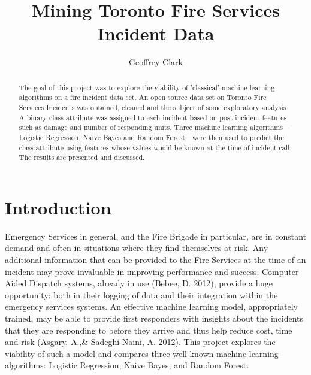 \documentclass[12pt,letterpaper, oneside]
{article}
\title{Mining Toronto Fire Services Incident Data}
\author{Geoffrey Clark}
\affil{Prepared for Dr. Ceni Babaoglu
\\ CKME136: Data Analytics Capstone Course 
\\ Data Science Lab, Ryerson University}
\begin{document}
\maketitle
\vspace{-1cm}
\begin{abstract}
The goal of this project was to explore the viability of 'classical' machine learning algorithms on a fire incident data set. An open source data set on Toronto Fire Services Incidents was obtained, cleaned and the subject of some exploratory analysis. A binary class attribute was assigned to each incident based on post-incident features such as damage and number of responding units. Three machine learning algorithms—Logistic Regression, Naive Bayes and Random Forest—were then used to predict the class attribute using features whose values would be known at the time of incident call. The results are presented and discussed.
\end{abstract}

\tableofcontents 


\section{Introduction}

Emergency Services in general, and the Fire Brigade in particular, are in constant demand and often in situations where they find themselves at risk. Any additional information that can be provided to the Fire Services at the time of an incident may prove invaluable in improving performance and success. Computer Aided Dispatch systems, already in use (Bebee, D. 2012), provide a huge opportunity: both in their logging of data and their integration within the emergency services systems. An effective machine learning model, appropriately trained, may be able to provide first responders with insights about the incidents that they are responding to before they arrive and thus help reduce cost, time and risk (Asgary, A.,\& Sadeghi-Naini, A. 2012). This project explores the viability of such a model and compares three well known machine learning algorithms: Logistic Regression, Naive Bayes, and Random Forest. 
\end{document}
